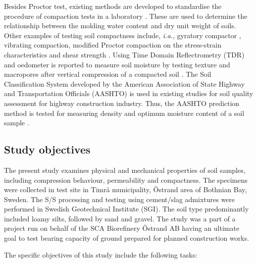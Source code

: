 \documentclass{amestyle}
\begin{document}
Besides Proctor test, existing methods are developed to standardise the procedure of compaction tests in a laboratory \cite{ASTM2007,ASTM2009}. These are used to determine the relationship between the molding water content and dry unit weight of soils. Other examples of testing soil compactness include, \emph{i.a.}, gyratory compactor \cite{Leeetal2007}, vibrating compaction, modified Proctor compaction on the stress-strain characteristics and shear strength \cite{Long}. Using Time Domain Reflectrometry (TDR) and oedometer is reported to measure soil moisture by testing texture and macropores after vertical compression of a compacted soil \cite{Alaoui}. The Soil Classification System developed by the American Association of State Highway and Transportation Officials (AASHTO) is used in existing studies for soil quality assessment for highway construction industry. Thus, the AASHTO prediction method is tested for measuring density and optimum moisture content of a soil sample \cite{Livneh}. 

\newpage
\subsection{Study objectives} 
The present study examines physical and mechanical properties of soil samples, including compression behaviour, permeability and compactness. The specimens were collected in test site in Timrå municipality, Östrand area of Bothnian Bay, Sweden. The S/S processing and testing using cement/slag admixtures were performed in Swedish Geotechnical Institute (SGI). The soil type predominantly included loamy silts, followed by sand and gravel. The study was a part of a project run on behalf of the SCA Biorefinery Östrand AB having an ultimate goal to test bearing capacity of ground prepared for planned construction works. 

The specific objectives of this study include the following tasks: 
\end{document}
